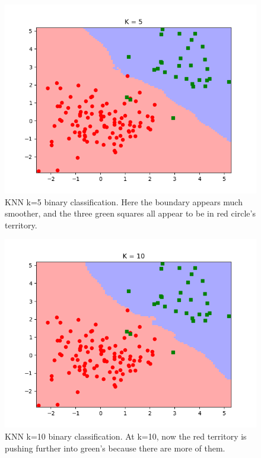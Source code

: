 \documentclass[10pt]{article}
\begin{document}
\begin{itemize}
\begin{figure}[H]
\centering
  \includegraphics{code/knn_binary_data-k-5.png}
 \caption{KNN k=5 binary classification. Here the boundary appears much smoother, and the three green squares all appear to be in red circle's territory.}
\end{figure}

\begin{figure}[H]
\centering
  \includegraphics{code/knn_binary_data-k-10.png}
 \caption{KNN k=10 binary classification. At k=10, now the red territory is pushing further into green's because there are more of them.}
\end{figure}


\end{itemize}
\end{document}
